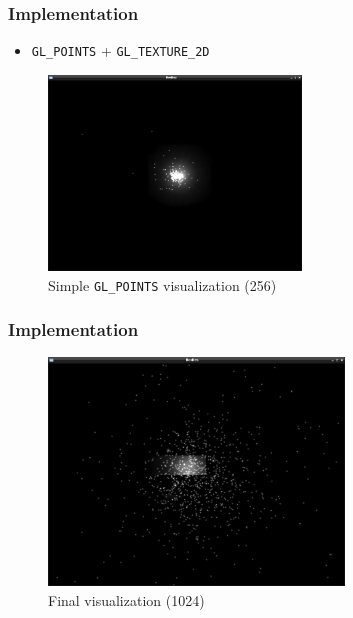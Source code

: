 \begin{frame}
    \frametitle{Implementation}
    \begin{itemize}
        \item \texttt{GL\_POINTS} + \texttt{GL\_TEXTURE\_2D}
    \end{itemize}
    \begin{figure}
        \begin{center}
           \includegraphics[width=0.6\textwidth]{img/bodies_con_textura} 
        \end{center}
        \caption{Simple \texttt{GL\_POINTS} visualization (256)}
    \end{figure}
\end{frame}

\begin{frame}
    \frametitle{Implementation}
    \begin{figure}
        \begin{center}
           \includegraphics[width=0.7\textwidth]{img/bodies_con_textura_1024-2} 
        \end{center}
        \caption{Final visualization (1024)}
    \end{figure}
\end{frame}

